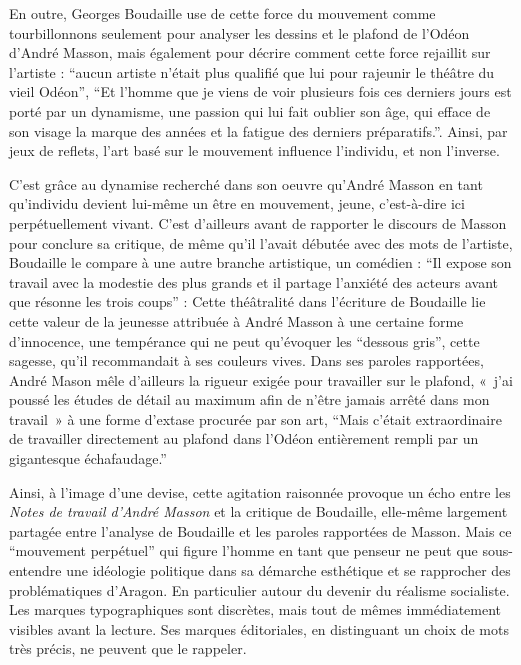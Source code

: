 En outre, Georges Boudaille use de cette force du mouvement comme tourbillonnons seulement pour analyser les dessins et le plafond de l’Odéon d’André Masson, mais également pour décrire comment cette force rejaillit sur l’artiste : \enquote{aucun artiste n’était plus qualifié que lui pour rajeunir le théâtre du vieil Odéon}, \enquote{Et l’homme que je viens de voir plusieurs fois ces derniers jours est porté par un dynamisme, une passion qui lui fait oublier son âge, qui efface de son visage la marque des années et la fatigue des derniers préparatifs.}. Ainsi, par jeux de reflets, l’art basé sur le mouvement influence l’individu, et non l’inverse. 

	C’est grâce au dynamise recherché dans son oeuvre qu’André Masson en tant qu’individu devient lui-même un être en mouvement, jeune, c’est-à-dire ici perpétuellement vivant. C’est d’ailleurs avant de rapporter le discours de Masson pour conclure sa critique, de même qu’il l’avait débutée avec des mots de l’artiste, Boudaille le compare à une autre branche artistique, un comédien : \enquote{Il expose son travail avec la modestie des plus grands et il partage l’anxiété des acteurs avant que résonne les trois coups} : Cette théâtralité dans l’écriture de Boudaille lie cette valeur de la jeunesse attribuée à André Masson à une certaine forme d’innocence, une tempérance qui ne peut qu’évoquer les \enquote{dessous gris}, cette sagesse, qu’il recommandait à ses couleurs vives. Dans ses paroles rapportées, André Mason mêle d’ailleurs la rigueur exigée pour travailler sur le plafond, « j’ai poussé les études de détail au maximum afin de n’être jamais arrêté dans mon travail » à une forme d’extase procurée par son art, \enquote{Mais c’était extraordinaire de travailler directement au plafond dans l’Odéon entièrement rempli par un gigantesque échafaudage.}

	Ainsi, à l’image d’une devise, cette agitation raisonnée provoque un écho entre les \emph{Notes de travail d’André Masson} et la critique de Boudaille, elle-même largement partagée entre l’analyse de Boudaille et les paroles rapportées de Masson. Mais ce \enquote{mouvement perpétuel} qui figure l’homme en tant que penseur ne peut que sous-entendre une idéologie politique dans sa démarche esthétique et se rapprocher des problématiques d’Aragon. En particulier autour du devenir du réalisme socialiste. Les marques typographiques sont discrètes, mais tout de mêmes immédiatement visibles avant la lecture. Ses marques éditoriales, en distinguant un choix de mots très précis, ne peuvent que le rappeler. 

